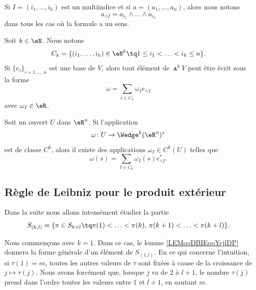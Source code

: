 \begin{normaltext}
	Si \( I=(i_1,\ldots,i_k)\) est un multiindice et si \( a=(a_1,\ldots,a_n)\), alors nous notons
	\begin{equation}
		a_{\wedge I}=a_{i_1}\wedge \ldots \wedge a_{i_k}
	\end{equation}
	dans tous les cas où la formule a un sens.
\end{normaltext}

\begin{proposition}		\label{PROPooSDVXooLvwPbg}
	Soit \( k\in \eN\). Nous notons
	\begin{equation}
		C_k=\{ (i_1,\ldots,i_k)\in \eN^k\tq 1\leq i_1<\ldots <i_k\leq n \}.
	\end{equation}
	Si \( \{ e_i \}_{i=1,\ldots, n}\) est une base de \( V\), alors tout élément de \( \Wedge^kV\) peut être écrit sous la forme
	\begin{equation}
		\omega=\sum_{i\in C_k}\omega_Ie_{\wedge I}
	\end{equation}
	avec \( \omega_I\in \eR\).
\end{proposition}
\ssdem

\begin{proposition}		\label{PROPooDXTOooKYDOiI}
	Soit un ouvert \( U\) dans \( \eR^n\). Si l'application
	\begin{equation}
		\omega \colon U\to \Wedge^k(\eR^n)^*
	\end{equation}
	est de classe \( C^k\), alors il existe des applications \( \omega_I\in C^k(U)\) telles que
	\begin{equation}
		\omega(s)=\sum_{I\in C_k}\omega_I(s)e^*_{\wedge I}.
	\end{equation}
\end{proposition}

\ssdem

\subsection{Règle de Leibniz pour le produit extérieur}

Dans la suite nous allons intensément étudier la partie
\begin{equation}
	S_{(k,l)}=\{ \pi\in S_{k+l}\tq \pi(1)<\ldots <\pi(k),\,\pi(k+1)<\ldots <\pi(k+l) \}.
\end{equation}

Nous commençons avec \( k=1\). Dans ce cas, le lemme \ref{LEMooDBIEooYcjlDP} donnera la forme générale d'un élément de \( S_{(1,l)}\). En ce qui concerne l'intuition, si \( \tau(1)=m\), toutes les autres valeurs de \( \tau\) sont fixées à cause de la croissance de \( j\mapsto \tau(j)\). Nous avons forcément que, lorsque \( j\) va de \( 2\) à \( l+1\), le nombre \( \tau(j)\) prend dans l'ordre toutes les valeurs entre \( 1\) et \( l+1\), en sautant \( m\).

